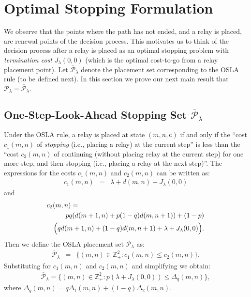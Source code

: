 \documentclass[conference]{IEEEtran}
\begin{document}
\section{Optimal Stopping Formulation} 
\label{OSLA_formulation_section}
We observe that the points where the path has not ended, and a relay is placed, 
are renewal points of the 
decision process. This motivates us to think of the decision process after a relay is placed as an 
optimal stopping problem with \emph{termination cost} $J_\lambda(0,0)$ (which is the optimal cost-to-go 
from a relay placement point). Let $\overline{\mathcal{P}}_\lambda$ denote the placement set 
corresponding to the OSLA rule (to be defined next). In this section we prove our next  main result 
that $\mathcal{P}_\lambda=\overline{\mathcal{P}}_\lambda$.

\subsection{One-Step-Look-Ahead Stopping Set
  $\overline{\mathcal{P}}_{\lambda}$}
Under the OSLA rule, a relay is placed at state $(m,n,\mathsf{c})$ if
and only if the ``cost $c_1(m,n)$ of \emph{stopping} (i.e., placing a
relay) at the current step'' is less than the ``cost $c_2(m,n)$ of
continuing (without placing relay at the current step) for one more
step, and then stopping (i.e., placing a relay at the next step)''. The
expressions for the costs $c_1(m,n)$ and $c_2(m,n)$ can be written as:
\begin{eqnarray*}
c_1(m,n)&=&\lambda+d(m,n)+J_\lambda(0,0)
\end{eqnarray*}
and
\begin{eqnarray*}
\lefteqn{c_2(m,n)=}\nonumber\\
&& pq(d(m+1,n)+p(1-q)d(m,n+1))+(1-p)\nonumber\\
&&\Big(qd(m+1,n)+(1-q)d(m,n+1)+\lambda+J_\lambda(0,0)\Big).\nonumber
\end{eqnarray*}
Then we define the OSLA placement set $\overline{\mathcal{P}}_\lambda$ as:
\begin{eqnarray*}
\overline{\mathcal{P}}_\lambda &=& \{(m,n)\in \mathbb{Z}_{+}^2: c_1(m,n)\le c_2(m,n)\}.  
\end{eqnarray*}
Substituting for $c_1(m,n)$ and $c_2(m,n)$ and simplifying we obtain:
\begin{eqnarray}
\label{OSLA_2}
\overline{\mathcal{P}}_{\lambda}=\Big\{(m,n)\in \mathbb{Z}_{+}^2: p(\lambda+J_{\lambda}(0,0))\leq\Delta_q(m,n)\Big\},
\end{eqnarray}
where $\Delta_q(m,n)=q\Delta_1(m,n)+ (1-q)\Delta_2(m,n)$.
\end{document}
